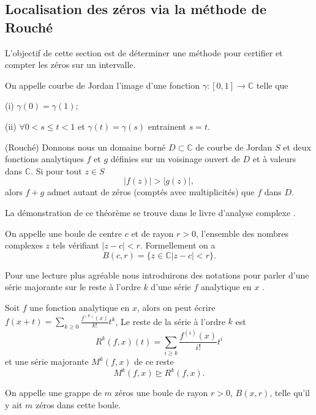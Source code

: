 \documentclass[a4paper,10pt]{article}
\begin{document}
	\subsection{Localisation des zéros via la méthode de Rouché}
	
	L'objectif de cette section est de déterminer une méthode pour certifier et compter les zéros sur un intervalle. 
	
	\begin{definition}
		On appelle courbe de Jordan l'image d'une fonction $\gamma:[0,1]\rightarrow \mathbb{C}$ telle que 
		
		(i) $\gamma(0)=\gamma(1)$;
		
		(ii) $\forall 0<s\leq t<1$ et $\gamma(t)=\gamma(s)$ entrainent $s=t$.
	\end{definition}
	
	\begin{theorem}(Rouché) Donnons nous un domaine borné $D \subset \mathbb{C}$ de courbe de Jordan $S$ et deux fonctions analytiques $f$ et $g$ définies sur un voisinage ouvert de $D$ et à valeurs dans $\mathbb{C}$. Si pour tout $z \in S$ 
	\[|f(z)|>|g(z)|,\]
	alors $f+g$ admet autant de zéros (comptés avec multiplicités) que $f$ dans $D$.
	\label{Rouché}
	\end{theorem}
	La démonstration de ce théorème se trouve dans le livre d'analyse complexe \cite{serov2015complex}.
	\begin{definition}
		On appelle une boule de centre $c$ et de rayon $r>0$, l'ensemble des nombres complexes $z$ tels vérifiant $|z-c|<r$. Formellement on a   
		\[B(c,r)=\{z \in \mathbb{C} |z-c|<r\}.\]
	\end{definition}
	
	Pour une lecture plus agréable nous introduirons des notations pour parler d'une série majorante sur le reste à l'ordre $k$ d'une série $f$ analytique en $x$ .
	
	\begin{definition} Soit $f$ une fonction analytique en $x$, alors on peut écrire $f(x+t)=\sum_{k \geq 0} \frac{f^{(k)}(x)}{k!}t^{k}$, Le reste de la série à l'ordre $k$ est  
		\[R^{k}(f,x)(t)=\sum_{i \geq k} \frac{f^{(i)}(x)}{i!}t^{i}\]
		et une série majorante $M^k(f,x)$ de ce reste
		\[M^k(f,x) \unrhd R^k(f,x).\]
	\end{definition}
	\begin{definition}
		On appelle une grappe de $m$ zéros une boule de rayon $r>0$, $B(x,r)$, telle qu'il y ait $m$ zéros dans cette boule.
	\end{definition}
	
\end{document}
